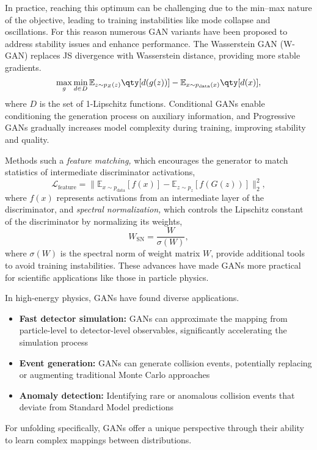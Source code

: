        In practice, reaching this optimum can be challenging due to the min--max nature of the objective, leading to training instabilities like mode collapse and oscillations.
        For this reason numerous GAN variants have been proposed to address stability issues and enhance performance.
        The Wasserstein GAN (W-GAN)  replaces JS divergence with Wasserstein distance, providing more stable gradients.
        \begin{equation}
        \max_g\min_{d\in D}\mathbb{E}_{z\sim p_Z(z)} \qty[d(g(z))] - \mathbb{E}_{x\sim p_{\text{data}}(x)} \qty[d(x)],
        \end{equation}
        where $D$ is the set of 1-Lipschitz functions.
        Conditional GANs  enable conditioning the generation process on auxiliary information, and
        Progressive GANs  gradually increases model complexity during training, improving stability and quality.
    
        Methods such a \emph{feature matching,} which encourages the generator to match statistics of intermediate discriminator activations,
        \begin{equation}
            \mathcal{L}_{\text{feature}} = \|\mathbb{E}_{x \sim p_{\text{data}}}[f(x)] - \mathbb{E}_{z \sim p_z}[f(G(z))]\|_2^2,
        \end{equation}
        where \(f(x)\) represents activations from an intermediate layer of the discriminator, and
        \emph{spectral normalization,} which controls the Lipschitz constant of the discriminator by normalizing its weights,
        \begin{equation}
            W_{\text{SN}} = \frac{W}{\sigma(W)},
        \end{equation}
        where \(\sigma(W)\) is the spectral norm of weight matrix \(W\), provide additional tools to avoid training instabilities.
        These advances have made GANs more practical for scientific applications like those in particle physics.
    
        In high-energy physics, GANs have found diverse applications.
        \begin{itemize}
            \item \textbf{Fast detector simulation:} GANs can approximate the mapping from particle-level to detector-level observables, significantly accelerating the simulation process 
            \item \textbf{Event generation:} GANs can generate collision events, potentially replacing or augmenting traditional Monte Carlo approaches 
            \item \textbf{Anomaly detection:} Identifying rare or anomalous collision events that deviate from Standard Model predictions 
        \end{itemize}
        For unfolding specifically, GANs offer a unique perspective through their ability to learn complex mappings between distributions.
    
